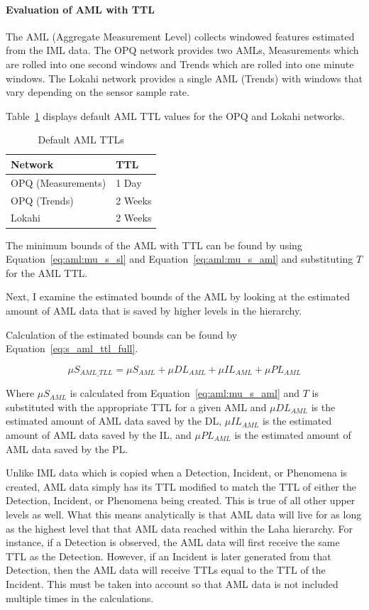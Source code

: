 \paragraph{Evaluation of AML with TTL}
The AML (Aggregate Measurement Level) collects windowed features estimated from the IML data. The OPQ network provides two AMLs, Measurements which are rolled into one second windows and Trends which are rolled into one minute windows. The Lokahi network provides a single AML (Trends) with windows that vary depending on the sensor sample rate.

Table~\ref{table:ttls_aml} displays default AML TTL values for the OPQ and Lokahi networks.

\begin{table}[H]
	\centering
	\caption{Default AML TTLs}
	\begin{tabularx}{\textwidth}{Xl}
		\toprule
		\textbf{Network} & \textbf{TTL} \\
		\midrule
		OPQ (Measurements) & 1 Day \\
        OPQ (Trends) & 2 Weeks \\
        Lokahi & 2 Weeks \\
		\bottomrule
	\end{tabularx}
	\label{table:ttls_aml}
\end{table}

The minimum bounds of the AML with TTL can be found by using Equation~\ref{eq:aml:mu_s_sl} and Equation~\ref{eq:aml:mu_s_aml} and substituting $T$ for the AML TTL\@.

Next, I examine the estimated bounds of the AML by looking at the estimated amount of AML data that is saved by higher levels in the hierarchy.

Calculation of the estimated bounds can be found by Equation~\ref{eq:s_aml_ttl_full}.

\begin{equation}\label{eq:s_aml_ttl_full}
	\mu S_{AML\_TLL} = \mu S_{AML} + \mu DL_{AML} + \mu IL_{AML} + \mu PL_{AML}
\end{equation}

Where $\mu S_{AML}$ is calculated from Equation~\ref{eq:aml:mu_s_aml} and $T$ is substituted with the appropriate TTL for a given AML and $\mu DL_{AML}$ is the estimated amount of AML data saved by the DL, $\mu IL_{AML}$ is the estimated amount of AML data saved by the IL, and $\mu PL_{AML}$ is the estimated amount of AML data saved by the PL\@.

Unlike IML data which is copied when a Detection, Incident, or Phenomena is created, AML data simply has its TTL modified to match the TTL of either the Detection, Incident, or Phenomena being created. This is true of all other upper levels as well. What this means analytically is that AML data will live for as long as the highest level that that AML data reached within the Laha hierarchy. For instance, if a Detection is observed, the AML data will first receive the same TTL as the Detection. However, if an Incident is later generated from that Detection, then the AML data will receive TTLs equal to the TTL of the Incident. This must be taken into account so that AML data is not included multiple times in the calculations.

